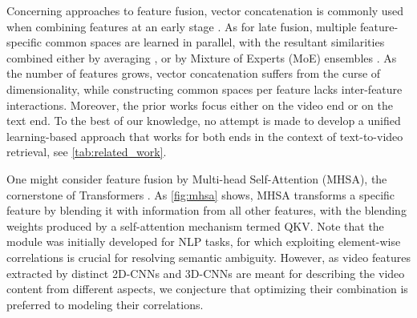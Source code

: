 Concerning approaches to feature fusion, vector concatenation is commonly used when combining features at an early stage \cite{LiXirong2019W2VVPP,Dong2021DE_hybrid}. As for late fusion, multiple feature-specific common spaces are learned in parallel, with the resultant similarities combined either by averaging \cite{mithun2018learning_r2,LiXirong2020SEA},  or by Mixture of Experts (MoE) ensembles \cite{liu2019use}. As the number of features grows, vector concatenation suffers from the curse of dimensionality, while constructing common spaces per feature lacks inter-feature interactions. Moreover, the prior works focus either on the video end or on the text end.
To the best of our knowledge, no attempt is made to develop a unified learning-based approach that works for both ends in the context of text-to-video retrieval, see \cref{tab:related_work}.


One might consider feature fusion by Multi-head Self-Attention (MHSA), the cornerstone of Transformers \cite{vaswani2017attention}. As \cref{fig:mhsa} shows, MHSA transforms a specific feature by blending it with information from all other features, with the blending weights produced by a self-attention mechanism termed QKV. Note that the module was initially developed for NLP tasks, for which exploiting element-wise correlations is crucial for resolving semantic ambiguity. However, as video features extracted by distinct 2D-CNNs and 3D-CNNs are meant for describing the video content from different aspects, we conjecture that optimizing their combination is preferred to modeling their correlations.  



\newlength{\twosubht}
\newsavebox{\twosubbox}

